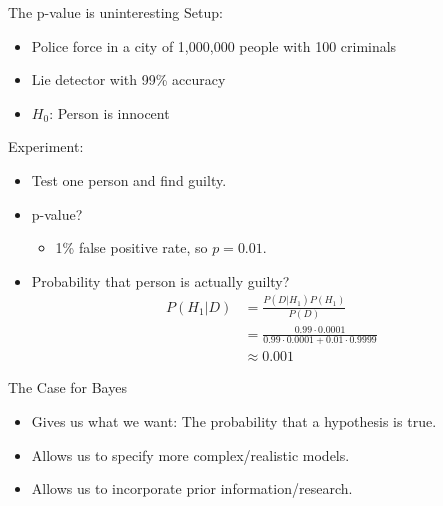 \begin{frame}{The p-value is uninteresting}
Setup:
	\begin{itemize}
		\item Police force in a city of 1,000,000 people with 100 criminals
		\item Lie detector with 99\% accuracy
		\item $H_0$: Person is innocent
	\end{itemize}
Experiment:
	\begin{itemize}
		\item Test one person and find guilty.
		\item p-value?
		\pause
		\begin{itemize}
			\item 1\% false positive rate, so $p = 0.01$.
		\end{itemize}
		\pause
		\item Probability that person is actually guilty?
		\pause
		\begin{align*} 
			P(H_1|D) &= \frac{P(D|H_1)P(H_1)}{P(D)} \\
					 &= \frac{0.99 \cdot 0.0001}
					   		 {0.99 \cdot 0.0001 + 0.01 \cdot 0.9999} \\
					 &\approx 0.001
		\end{align*}
	\end{itemize}
\end{frame}

\begin{frame}{The Case for Bayes}
	\begin{itemize}
		\item Gives us what we want: The probability that a hypothesis is true.
		\item Allows us to specify more complex/realistic models.
		\item Allows us to incorporate prior information/research.
	\end{itemize}
\end{frame}
